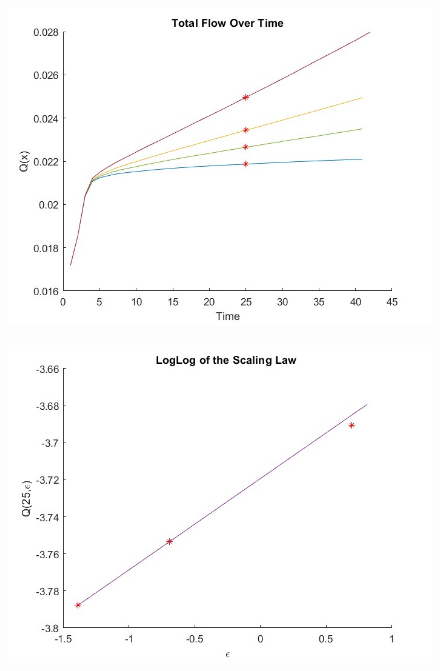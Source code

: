 \documentclass[11pt]{article}
\begin{document}
\begin{minipage}{0.37\textwidth}
    \begin{figure}[H]%
    \centering
    \includegraphics[width=\textwidth]{Figs/S14_fig1.jpg}
    \label{fig:S14_fig1}
    \end{figure}
    \begin{figure}[H]%
    \centering
    \includegraphics[width=\textwidth]{Figs/S14_fig2.jpg}
    \label{fig:S14_fig2}
    \end{figure}
\end{minipage}

\vspace{5pt}
\end{document}
